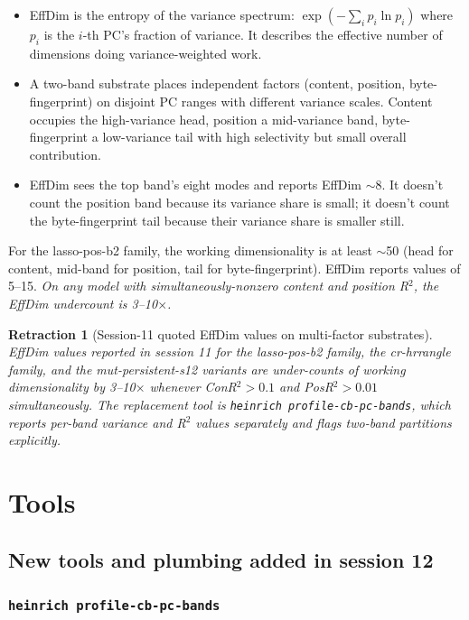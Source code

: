 \documentclass[11pt,openany]{book}
\newtheorem{retraction}{Retraction}[chapter]
\begin{document}
\begin{itemize}
  \item EffDim is the entropy of the variance spectrum: $\exp(-\sum_i p_i \ln
  p_i)$ where $p_i$ is the $i$-th PC's fraction of variance. It describes
  the effective number of dimensions doing variance-weighted work.
  \item A two-band substrate places independent factors (content, position,
  byte-fingerprint) on disjoint PC ranges with different variance scales.
  Content occupies the high-variance head, position a mid-variance band,
  byte-fingerprint a low-variance tail with high selectivity but small overall
  contribution.
  \item EffDim sees the top band's eight modes and reports EffDim $\sim 8$.
  It doesn't count the position band because its variance share is small;
  it doesn't count the byte-fingerprint tail because their variance share is
  smaller still.
\end{itemize}

For the lasso-pos-b2 family, the working dimensionality is at least
$\sim$50 (head for content, mid-band for position, tail for
byte-fingerprint). EffDim reports values of 5--15. \emph{On any model
with simultaneously-nonzero content and position R$^2$, the EffDim
undercount is 3--10$\times$.}

\begin{retraction}[Session-11 quoted EffDim values on multi-factor substrates]
EffDim values reported in session 11 for the lasso-pos-b2 family, the
cr-hrrangle family, and the mut-persistent-s12 variants are
under-counts of working dimensionality by 3--10$\times$ whenever
ConR$^2 > 0.1$ and PosR$^2 > 0.01$ simultaneously. The replacement tool
is \texttt{heinrich profile-cb-pc-bands}, which reports per-band variance
and R$^2$ values separately and flags two-band partitions explicitly.
\end{retraction}

\part{Tools}

\chapter{New tools and plumbing added in session 12}
\label{ch:tools}

\section{\texttt{heinrich profile-cb-pc-bands}}
\end{document}
